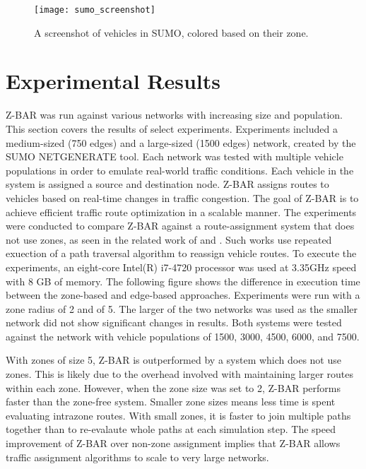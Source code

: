 \documentclass[conference]{IEEEtran}
\begin{document}
\begin{figure}[h]
\caption{A screenshot of vehicles in SUMO, colored based on their zone.}
\centering
\texttt{[image: sumo\_screenshot]}
\end{figure}


\section{Experimental Results} %

Z-BAR was run against various networks with increasing size and population. This section covers the results of select experiments. Experiments included a medium-sized (750 edges) and a large-sized (1500 edges) network, created by the SUMO NETGENERATE tool. Each network was tested with multiple vehicle populations in order to emulate real-world traffic conditions. Each vehicle in the system is assigned a source and destination node. Z-BAR assigns routes to vehicles based on real-time changes in traffic congestion. The goal of Z-BAR is to achieve efficient traffic route optimization in a scalable manner. The experiments were conducted to compare Z-BAR against a route-assignment system that does not use zones, as seen in the related work of \cite{iaco} and \cite{dtpos}. Such works use repeated exuection of a path traversal algorithm to reassign vehicle routes. To execute the experiments, an eight-core Intel(R) i7-4720 processor was used at 3.35GHz speed with 8 GB of memory. The following figure shows the difference in execution time between the zone-based and edge-based approaches. Experiments were run with a zone radius of 2 and of 5. The larger of the two networks was used as the smaller network did not show significant changes in results. Both systems were tested against the network with vehicle populations of 1500, 3000, 4500, 6000, and 7500.




With zones of size 5, Z-BAR is outperformed by a system which does not use zones. This is likely due to the overhead involved with maintaining larger routes within each zone. However, when the zone size was set to 2, Z-BAR performs faster than the zone-free system. Smaller zone sizes means less time is spent evaluating intrazone routes. With small zones, it is faster to join multiple paths together than to re-evalaute whole paths at each simulation step. The speed improvement of Z-BAR over non-zone assignment implies that Z-BAR allows traffic assignment algorithms to scale to very large networks.
\end{document}
